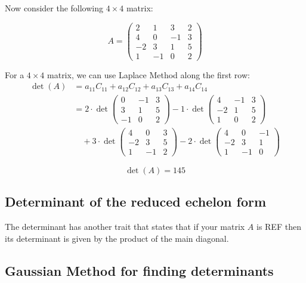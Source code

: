  Now consider the following \(4 \times 4\) matrix:

\begin{equation*}
A = 
\begin{pmatrix}
2 & 1 & 3 & 2 \\
4 & 0 & -1 & 3 \\
-2 & 3 & 1 & 5 \\
1 & -1 & 0 & 2
\end{pmatrix}
\end{equation*}

For a \(4 \times 4\) matrix, we can use Laplace Method along the first row:
\begin{align*}
\det(A) &= a_{11}C_{11} + a_{12}C_{12} + a_{13}C_{13} + a_{14}C_{14} \\
&= 2 \cdot \det\begin{pmatrix} 0 & -1 & 3 \\ 3 & 1 & 5 \\ -1 & 0 & 2 \end{pmatrix} 
- 1 \cdot \det\begin{pmatrix} 4 & -1 & 3 \\ -2 & 1 & 5 \\ 1 & 0 & 2 \end{pmatrix} \\
&\quad + 3 \cdot \det\begin{pmatrix} 4 & 0 & 3 \\ -2 & 3 & 5 \\ 1 & -1 & 2 \end{pmatrix} 
- 2 \cdot \det\begin{pmatrix} 4 & 0 & -1 \\ -2 & 3 & 1 \\ 1 & -1 & 0 \end{pmatrix}
\end{align*}

\[\det(A) = 145\]

\subsection{Determinant of the reduced echelon form}

The determinant has another trait that states that if your matrix \(A\) is REF then
its determinant is given by the product of the main diagonal. 

\subsection{Gaussian Method for finding determinants}

